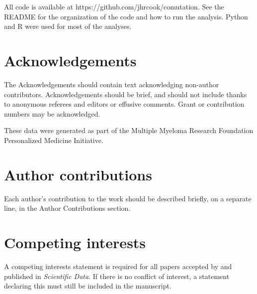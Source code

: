 \documentclass[english, 10pt, letterpaper]{article}
\begin{document}
All code is available at https://github.com/jhrcook/comutation.
See the README for the organization of the code and how to run the analysis.
Python \cite{van1995python} and R \cite{Rlang} were used for most of the analyses.



\section*{Acknowledgements}

The Acknowledgements should contain text acknowledging non-author contributors.
Acknowledgements should be brief, and should not include thanks to anonymous referees and editors or effusive comments.
Grant or contribution numbers may be acknowledged.

These data were generated as part of the Multiple Myeloma Research Foundation Personalized Medicine Initiative.

\section*{Author contributions}

Each author’s contribution to the work should be described briefly, on a separate line, in the Author Contributions section. 

\section*{Competing interests}

A competing interests statement is required for all papers accepted by and published in \emph{Scientific Data}. If there is no conflict of interest, a statement declaring this must still be included in the manuscript.



{}

\newpage
\end{document}
